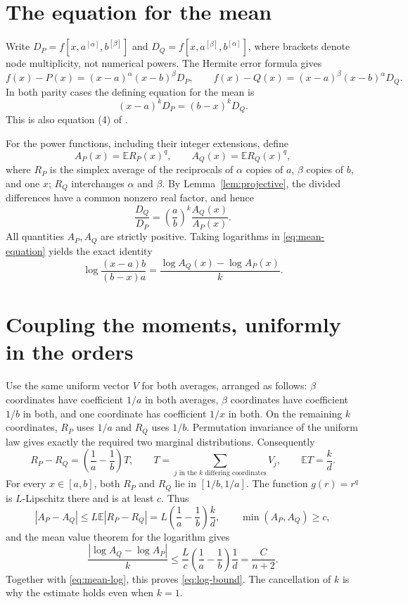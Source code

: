 \documentclass[11pt]{article}
\newcommand{\E}{\mathbb E}
\begin{document}
\section*{The equation for the mean}
Write $D_P=f[x,a^{[\alpha]},b^{[\beta]}]$ and
$D_Q=f[x,a^{[\beta]},b^{[\alpha]}]$, where brackets denote node
multiplicity, not numerical powers. The Hermite error formula gives
\[
f(x)-P(x)=(x-a)^\alpha(x-b)^\beta D_P,\qquad
f(x)-Q(x)=(x-a)^\beta(x-b)^\alpha D_Q.
\]
In both parity cases the defining equation for the mean is
\begin{equation}\label{eq:mean-equation}
(x-a)^kD_P=(b-x)^kD_Q.
\end{equation}
This is also equation (4) of \cite{horwitz}.

For the power functions, including their integer extensions, define
\[
A_P(x)=\E R_P(x)^q,\qquad A_Q(x)=\E R_Q(x)^q,
\]
where $R_P$ is the simplex average of the reciprocals of
$\alpha$ copies of $a$, $\beta$ copies of $b$, and one $x$;
$R_Q$ interchanges $\alpha$ and $\beta$.
By Lemma~\ref{lem:projective}, the divided differences have a common
nonzero real factor, and hence
\[
\frac{D_Q}{D_P}=\left(\frac ab\right)^k\frac{A_Q(x)}{A_P(x)}.
\]
All quantities $A_P,A_Q$ are strictly positive. Taking logarithms in
\eqref{eq:mean-equation} yields the exact identity
\begin{equation}\label{eq:mean-log}
\log\frac{(x-a)b}{(b-x)a}
 =\frac{\log A_Q(x)-\log A_P(x)}k.
\end{equation}

\section*{Coupling the moments, uniformly in the orders}
Use the same uniform vector $V$ for both averages, arranged as follows:
$\beta$ coordinates have coefficient $1/a$ in both averages,
$\beta$ coordinates have coefficient $1/b$ in both, and one coordinate
has coefficient $1/x$ in both. On the remaining $k$ coordinates,
$R_P$ uses $1/a$ and $R_Q$ uses $1/b$. Permutation invariance of the
uniform law gives exactly the required two marginal distributions.
Consequently
\[
R_P-R_Q=\left(\frac1a-\frac1b\right)T,\qquad
T=\sum_{j\text{ in the }k\text{ differing coordinates}}V_j,\qquad
\E T=\frac{k}{d}.
\]
For every $x\in[a,b]$, both $R_P$ and $R_Q$ lie in $[1/b,1/a]$.
The function $g(r)=r^q$ is $L$-Lipschitz there and is at least $c$.
Thus
\[
|A_P-A_Q|\le L\E|R_P-R_Q|
 =L\left(\frac1a-\frac1b\right)\frac{k}{d},
\qquad \min(A_P,A_Q)\ge c,
\]
and the mean value theorem for the logarithm gives
\begin{equation}\label{eq:coupling-bound}
\frac{|\log A_Q-\log A_P|}{k}
 \le\frac{L}{c}\left(\frac1a-\frac1b\right)\frac1d
 =\frac{C}{n+2}.
\end{equation}
Together with \eqref{eq:mean-log}, this proves \eqref{eq:log-bound}.
The cancellation of $k$ is why the estimate holds even when $k=1$.
\end{document}
